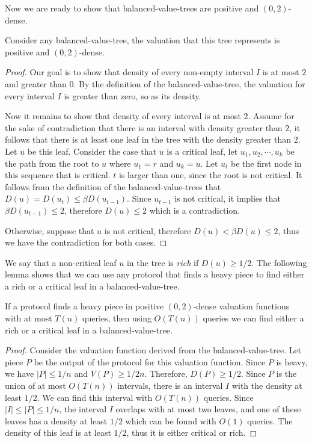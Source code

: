 Now we are ready to show that balanced-value-trees are positive and $(0,2)$-dense.
\begin{lemma}
Consider any balanced-value-tree, the valuation that this tree represents is positive and $(0,2)$-dense.
\end{lemma} 
\begin{proof}
Our goal is to show that density of every non-empty interval $I$ is at most $2$ and greater than $0$. By the definition of the balanced-value-tree, the valuation for every interval $I$ is greater than zero, so as its density.

Now it remains to show that density of every interval is at most $2$. Assume for the sake of contradiction that there is an interval with density greater than $2$, it follows that there is at least one leaf in the tree with the density greater than $2$. Let $u$ be this leaf. Consider the case that $u$ is a critical leaf, let $u_1,u_2,\cdots,u_k$ be the path from the root to $u$ where $u_1=r$ and $u_k=u$. Let $u_t$ be the first node in this sequence that is critical. $t$ is larger than one, since the root is not critical. It follows from the definition of the balanced-value-trees that $D(u)= D(u_t) \le \beta D(u_{t-1})$. Since $u_{t-1}$ is not critical, it implies that $ \beta D(u_{t-1}) \le 2$, therefore $D(u) \le 2$ which is a contradiction.

Otherwise, suppose that $u$ is not critical, therefore $D(u) < \beta D(u) \le 2$, thus we have the contradiction for both cases.  
\end{proof}

We say that a non-critical leaf $u$ in the tree is \textit{rich} if $D(u) \ge 1/2$. The following lemma shows that we can use any protocol that finds a heavy piece to find either a rich or a critical leaf in a balanced-value-tree.

\begin{lemma}
\label{reduc}
If a protocol finds a heavy piece in positive $(0,2)$-dense valuation functions with at most $T(n)$ queries, then using $O(T(n))$ queries we can find either a rich or a critical leaf in a balanced-value-tree. 
\end{lemma}
\begin{proof}
Consider the valuation function derived from the balanced-value-tree. Let piece $P$ be the output of the protocol for this valuation function. Since $P$ is heavy, we have $|P| \le 1/n$ and $V(P) \ge 1/2n$. Therefore, $D(P) \ge 1/2$. Since $P$ is the union of at most $O(T(n))$ intervals, there is an interval $I$ with the density at least $1/2$. We can find this interval with $O(T(n))$ queries. Since $|I| \le |P| \le 1/n$, the interval $I$ overlaps with at most two leaves, and one of these leaves has a density at least $1/2$ which can be found with $O(1)$ queries. The density of this leaf is at least $1/2$, thus it is either critical or rich.
\end{proof}

